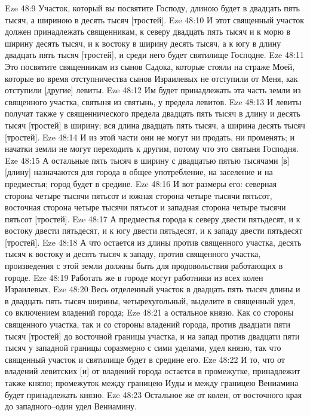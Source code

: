Eze 48:9  Участок, который вы посвятите Господу, длиною будет в двадцать пять тысяч, а шириною в десять тысяч [тростей].
Eze 48:10  И этот священный участок должен принадлежать священникам, к северу двадцать пять тысяч и к морю в ширину десять тысяч, и к востоку в ширину десять тысяч, а к югу в длину двадцать пять тысяч [тростей], и среди него будет святилище Господне.
Eze 48:11  Это посвятите священникам из сынов Садока, которые стояли на страже Моей, которые во время отступничества сынов Израилевых не отступили от Меня, как отступили [другие] левиты.
Eze 48:12  Им будет принадлежать эта часть земли из священного участка, святыня из святынь, у предела левитов.
Eze 48:13  И левиты получат также у священнического предела двадцать пять тысяч в длину и десять тысяч [тростей] в ширину; вся длина двадцать пять тысяч, а ширина десять тысяч [тростей].
Eze 48:14  И из этой части они не могут ни продать, ни променять; и начатки земли не могут переходить к другим, потому что это святыня Господня.
Eze 48:15  А остальные пять тысяч в ширину с двадцатью пятью тысячами [в] [длину] назначаются для города в общее употребление, на заселение и на предместья; город будет в средине.
Eze 48:16  И вот размеры его: северная сторона четыре тысячи пятьсот и южная сторона четыре тысячи пятьсот, восточная сторона четыре тысячи пятьсот и западная сторона четыре тысячи пятьсот [тростей].
Eze 48:17  А предместья города к северу двести пятьдесят, и к востоку двести пятьдесят, и к югу двести пятьдесят, и к западу двести пятьдесят [тростей].
Eze 48:18  А что остается из длины против священного участка, десять тысяч к востоку и десять тысяч к западу, против священного участка, произведения с этой земли должны быть для продовольствия работающих в городе.
Eze 48:19  Работать же в городе могут работники из всех колен Израилевых.
Eze 48:20  Весь отделенный участок в двадцать пять тысяч длины и в двадцать пять тысяч ширины, четырехугольный, выделите в священный удел, со включением владений города;
Eze 48:21  а остальное князю. Как со стороны священного участка, так и со стороны владений города, против двадцати пяти тысяч [тростей] до восточной границы участка, и на запад против двадцати пяти тысяч у западной границы соразмерно с сими уделами, удел князю, так что священный участок и святилище будет в средине его.
Eze 48:22  И то, что от владений левитских [и] от владений города остается в промежутке, принадлежит также князю; промежуток между границею Иуды и между границею Вениамина будет принадлежать князю.
Eze 48:23  Остальное же от колен, от восточного края до западного--один удел Вениамину.
